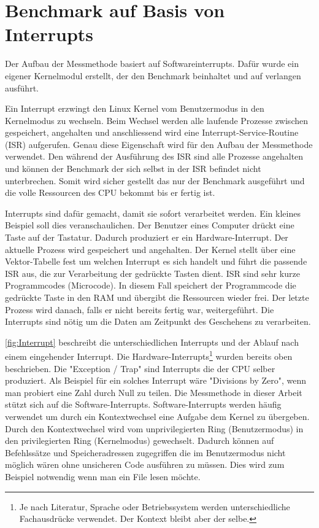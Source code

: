 
\section{Benchmark auf Basis von Interrupts}
\label{chap:benchmark_basis_interrupts}



Der Aufbau der Messmethode basiert auf Softwareinterrupts. Dafür wurde ein eigener Kernelmodul erstellt, der den Benchmark beinhaltet und auf verlangen ausführt.
\par
Ein Interrupt erzwingt den Linux Kernel vom Benutzermodus in den Kernelmodus zu wechseln\cite{Mandl2010_3}. Beim Wechsel werden alle laufende Prozesse zwischen gespeichert, angehalten und anschliessend wird eine Interrupt-Service-Routine (ISR) aufgerufen. Genau diese Eigenschaft wird für den Aufbau der Messmethode verwendet. Den während der Ausführung des ISR sind alle Prozesse angehalten und können der Benchmark der sich selbst in der ISR befindet nicht unterbrechen. Somit wird sicher gestellt das nur der Benchmark ausgeführt und die volle Ressourcen des CPU bekommt bis er fertig ist.
\par
Interrupts sind dafür gemacht, damit sie sofort verarbeitet werden. Ein kleines Beispiel soll dies veranschaulichen. Der Benutzer eines Computer drückt eine Taste auf der Tastatur. Dadurch produziert er ein Hardware-Interrupt. Der aktuelle Prozess wird gespeichert und angehalten. Der Kernel stellt über eine Vektor-Tabelle fest um welchen Interrupt es sich handelt und führt die passende ISR aus, die zur Verarbeitung der gedrückte Tasten dient. ISR sind sehr kurze Programmcodes (Microcode). In diesem Fall speichert der Programmcode die gedrückte Taste in den RAM und übergibt die Ressourcen wieder frei. Der letzte Prozess wird danach, falls er nicht bereits fertig war, weitergeführt. Die Interrupts sind nötig um die Daten am Zeitpunkt des Geschehens zu verarbeiten.
\par
\autoref{fig:Interrupt} beschreibt die unterschiedlichen Interrupts und der Ablauf nach einem eingehender Interrupt. Die Hardware-Interrupts\footnote{Je nach Literatur, Sprache oder Betriebssystem werden unterschiedliche Fachausdrücke verwendet. Der Kontext bleibt aber der selbe.} wurden bereits oben beschrieben. Die "Exception / Trap" sind Interrupts die der CPU selber produziert. Als Beispiel für ein solches Interrupt wäre "Divisions by Zero", wenn man probiert eine Zahl durch Null zu teilen. Die Messmethode in dieser Arbeit stützt sich auf die Software-Interrupts. Software-Interrupts werden häufig verwendet um durch ein Kontextwechsel eine Aufgabe dem Kernel zu übergeben. Durch den Kontextwechsel wird vom unprivilegierten Ring  (Benutzermodus) in den privilegierten Ring (Kernelmodus) gewechselt. Dadurch können auf Befehlssätze und Speicheradressen zugegriffen die im Benutzermodus nicht möglich wären ohne unsicheren Code ausführen zu müssen. Dies wird zum Beispiel notwendig wenn man ein File lesen möchte.

